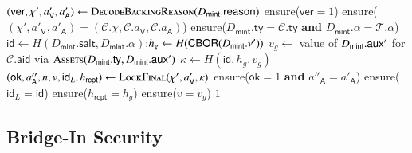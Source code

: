\begin{algorithm}[!htbp]
\caption{Backing Mint-Reason Verification}\label{alg:bridge-backing}
\begin{algorithmic}[0]
  \State $(\mathsf{ver},\chi',a'_\mathsf{V},a'_\mathsf{A}) \gets \Call{DecodeBackingReason}{D_\mathsf{mint}.\mathsf{reason}}$
  \State ensure($\mathsf{ver} = 1$)
  \State ensure($(\chi',a'_\mathsf{V},a'_\mathsf{A}) = (\mathcal{C}.\chi,\mathcal{C}.a_\mathsf{V},\mathcal{C}.a_\mathsf{A})$) 
  \State ensure($D_\mathsf{mint}.\mathsf{ty} = \mathcal{C}.\mathsf{ty}$ \textbf{and} $D_\mathsf{mint}.\alpha = \mathcal{T}.\alpha$)
  \State $\mathsf{id} \gets H(D_\mathsf{mint}.\mathsf{salt},D_\mathsf{mint}.\alpha)$;\quad $h_g \gets H(\mathsf{CBOR}(D_\mathsf{mint}.\nu'))$
  \State $v_g \gets$ value of $D_\mathsf{mint}.\mathsf{aux}'$ for $\mathcal{C}.\mathsf{aid}$ via $\Call{Assets}{D_\mathsf{mint}.\mathsf{ty},D_\mathsf{mint}.\auxd'}$
  \State $\kappa \gets H(\mathsf{id},h_g,v_g)$ 
  \State $(\mathsf{ok},a''_\mathsf{A},n,v,\mathsf{id}_L,h_\mathsf{rcpt}) \gets \Call{LockFinal}{\chi',a'_\mathsf{V},\kappa}$ 
  \State ensure($\mathsf{ok} = 1$ \textbf{and} $a''_\mathsf{A} = a'_\mathsf{A}$)
  \State ensure($\mathsf{id}_L = \mathsf{id}$) 
  \State ensure($h_\mathsf{rcpt} = h_g$) 
  \State ensure($v = v_g$) 
  \State \Return $1$
\EndFunction
\end{algorithmic}
\end{algorithm}

\subsection{Bridge-In Security}\label{app:bridging-in-security}

